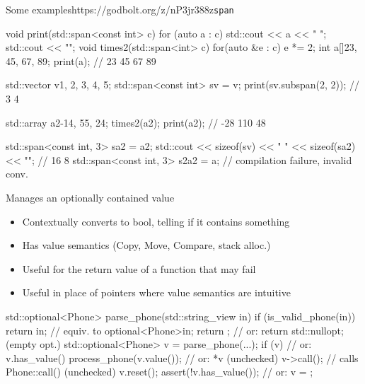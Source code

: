 \begin{frame}[fragile]
  \begin{exampleblockGB}{Some examples}{https://godbolt.org/z/nP3jr388z}{\texttt{span}}
    \scriptsize
    \begin{cppcode*}{}
      void print(std::span<const int> c) {
        for (auto a : c) { std::cout << a << " "; }
        std::cout << "\n";
      }
      void times2(std::span<int> c) {
        for(auto &e : c) { e *= 2; }
      }
      int a[]{23, 45, 67, 89};
      print(a);                 // 23 45 67 89

      std::vector v{1, 2, 3, 4, 5};
      std::span<const int> sv = v;
      print(sv.subspan(2, 2));  // 3 4

      std::array a2{-14, 55, 24};
      times2(a2);
      print(a2);                // -28 110 48

      std::span<const int, 3> sa2 = a2;
      std::cout << sizeof(sv) << " " << sizeof(sa2) << "\n";  // 16 8
      std::span<const int, 3> s2a2 = a; // compilation failure, invalid conv.
    \end{cppcode*}
  \end{exampleblockGB}
\end{frame}

\begin{frame}[fragile]
  \begin{block}{Manages an optionally contained value}
    \begin{itemize}
    \item Contextually converts to bool, telling if it contains something
    \item Has value semantics (Copy, Move, Compare, stack alloc.)
    \item Useful for the return value of a function that may fail
    \item Useful in place of pointers where value semantics are intuitive
    \end{itemize}
  \end{block}
  \begin{exampleblock}{}
    \small
    \begin{cppcode*}{}
      std::optional<Phone> parse_phone(std::string_view in) {
        if (is_valid_phone(in))
          return in; // equiv. to optional<Phone>{in};
        return {};   // or: return std::nullopt; (empty opt.)
      }
      std::optional<Phone> v = parse_phone(...);
      if (v) {                    // or: v.has_value()
        process_phone(v.value()); // or: *v (unchecked)
        v->call(); // calls Phone::call()   (unchecked)
      }
      v.reset(); assert(!v.has_value()); // or: v = {};
    \end{cppcode*}
  \end{exampleblock}
\end{frame}

